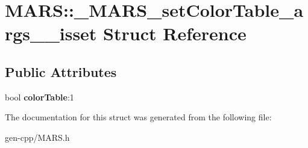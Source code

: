 \hypertarget{structMARS_1_1__MARS__setColorTable__args____isset}{}\section{M\+A\+RS\+:\+:\+\_\+\+M\+A\+R\+S\+\_\+set\+Color\+Table\+\_\+args\+\_\+\+\_\+isset Struct Reference}
\label{structMARS_1_1__MARS__setColorTable__args____isset}
\subsection*{Public Attributes}
\begin{DoxyCompactItemize}
\item 
\mbox{\label{structMARS_1_1__MARS__setColorTable__args____isset_a60088103948340c3f2c4a3b016d5fc56}} 
bool {\bfseries color\+Table}\+:1
\end{DoxyCompactItemize}


The documentation for this struct was generated from the following file\+:\begin{DoxyCompactItemize}
\item 
gen-\/cpp/M\+A\+R\+S.\+h\end{DoxyCompactItemize}
